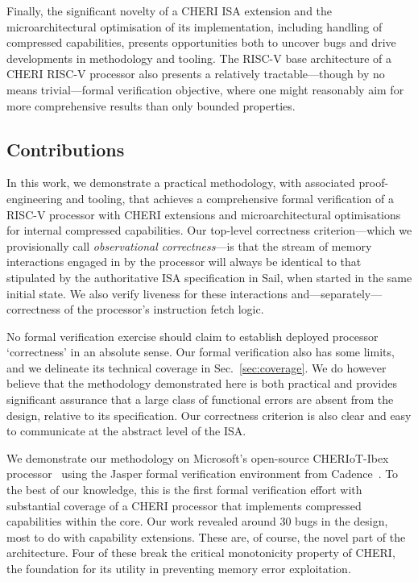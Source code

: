 \documentclass[10pt,conference]{IEEEtran}
\begin{document}
Finally, the significant novelty of a CHERI ISA extension and the
microarchitectural optimisation of its implementation, including handling
of compressed capabilities, presents opportunities both to uncover bugs and
drive developments in methodology and tooling. The RISC-V base architecture
of a CHERI RISC-V processor also presents a relatively tractable---though
by no means trivial---formal verification objective, where one might
reasonably aim for more comprehensive results than only bounded properties.

\subsection{Contributions}

In this work, we demonstrate a practical methodology, with associated
proof-engineering and tooling, that achieves a comprehensive formal
verification of a RISC-V processor with CHERI extensions and
microarchitectural optimisations for internal compressed capabilities. Our
top-level correctness criterion---which we provisionally call
\textit{observational correctness}---is that the stream of memory
interactions engaged in by the processor will always be identical to that
stipulated by the authoritative ISA specification in Sail, when started in
the same initial state. We also verify liveness for these interactions
and---separately---correctness of the processor's instruction fetch logic.

No formal verification exercise should claim to establish deployed
processor `correctness' in an absolute sense. Our formal verification also
has some limits, and we delineate its technical coverage in
Sec.~\ref{sec:coverage}. We do however believe that the methodology demonstrated here
is both practical and provides significant assurance that a large class of
functional errors are absent from the design, relative to its
specification. Our correctness criterion is also clear and easy to
communicate at the abstract level of the ISA.

We demonstrate our methodology on Microsoft's open-source CHERIoT-Ibex
processor~\cite{amar2023cheriot} using the Jasper formal verification
environment from Cadence~\cite{jasper}. To the best of our knowledge, this
is the first formal verification effort with substantial coverage of a CHERI
processor that implements compressed
capabilities within the core. Our work revealed around 30 bugs in the
design, most to do with capability extensions. These are, of course, the
novel part of the architecture.  Four of these break the critical
monotonicity property of CHERI, the foundation for its utility in
preventing memory error exploitation.
\end{document}
